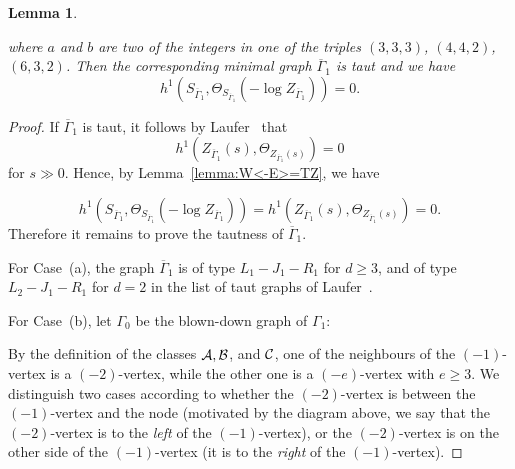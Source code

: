 \documentclass[a4paper, reqno, twoside]{amsart}
\newtheorem{lemma}[theorem]{Lemma}
\theoremstyle{definition}
\numberwithin{equation}{section}
\begin{document}
\begin{lemma}
\begin{enumerate}
\end{enumerate}
where $a$ and $b$ are two of the integers in one of the triples $(3,
3, 3)$, $(4, 4, 2)$, $(6, 3, 2)$. Then the corresponding minimal graph
$\overline{\Gamma}_1$ is taut and we have
\[h^1(S_{\overline{\Gamma}_1},
\Theta_{S_{\overline{\Gamma}_1}}(-\log{Z_{\overline{\Gamma}_1}}))=0.\]
\end{lemma}

\begin{proof}
If $\overline{\Gamma}_1$ is taut, it follows by
Laufer~\cite[Therorem~3.10]{Laufer-1973} that
\begin{equation*}
h^1(Z_{\overline{\Gamma}_1}(s), \Theta_{Z_{\overline{\Gamma}_1}(s)})=0
\end{equation*}
for $s \gg 0$. Hence, by Lemma~\ref{lemma:W<-E>=TZ}, we have

\begin{equation*}
h^1(S_{\overline{\Gamma}_1},
\Theta_{S_{\overline{\Gamma}_1}}(-\log{Z_{\overline{\Gamma}_1}}))=h^1(Z_{\overline{\Gamma}_1}(s),
\Theta_{Z_{\overline{\Gamma}_1}(s)})=0.
\end{equation*}
Therefore it remains to prove the tautness of ${\overline{\Gamma}_1}$.

For Case~(a), the graph $\overline{\Gamma}_1$ is of type $L_1-J_1-R_1$ for $d
\ge 3$, and of type $L_2-J_1-R_1$ for $d=2$ in the list of taut graphs
of Laufer~\cite[Table~IV, p.~139]{Laufer-1973-Taut}.

For Case~(b), let $\Gamma_0$ be the blown-down graph of $\Gamma_1$:
\begin{center}
\end{center}
By the definition of the classes ${\ensuremath \mathcal{A}}, {\ensuremath \mathcal{B}}$, and ${\ensuremath \mathcal{C}}$, one
of the neighbours of the $(-1)$-vertex is a $(-2)$-vertex, while the
other one is a $(-e)$-vertex with $e \ge 3$.  We distinguish two cases
according to whether the $(-2)$-vertex is between the $(-1)$-vertex
and the node (motivated by the diagram above, we say that the $(-2)$-vertex
is to the \emph{left} of the $(-1)$-vertex), or the $(-2)$-vertex is
on the other side of the $(-1)$-vertex (it is to the \emph{right} of
the $(-1)$-vertex).


\end{proof}
\end{document}
